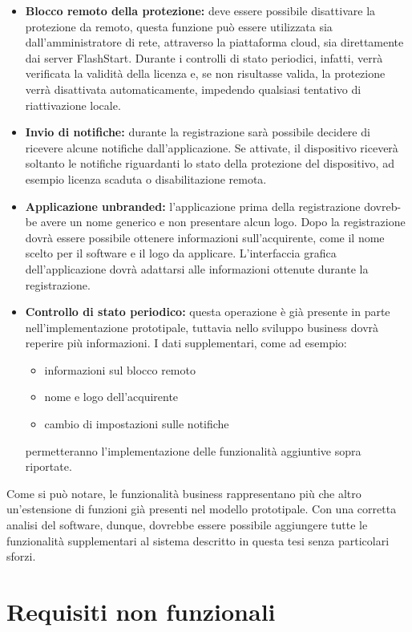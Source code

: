 \documentclass[12pt,a4paper,openright,twoside]{book}
\newcommand{\itemdef}[1]{\item \textbf{#1}}
\begin{document}
\begin{itemize}
	
	\itemdef{Blocco remoto della protezione:}
	deve essere possibile disattivare la protezione da remoto, questa funzione può essere utilizzata sia dall'amministratore di rete, attraverso la piattaforma cloud, sia direttamente dai server FlashStart.
	Durante i controlli di stato periodici, infatti, verrà verificata la validità della licenza e, se non risultasse valida, la protezione verrà disattivata automaticamente, impedendo qualsiasi tentativo di riattivazione locale.
	
	\itemdef{Invio di notifiche:}
	durante la registrazione sarà possibile decidere di ricevere alcune notifiche dall'applicazione.
	Se attivate, il dispositivo riceverà soltanto le notifiche riguardanti lo stato della protezione del dispositivo, ad esempio licenza scaduta o disabilitazione remota.
	
	\itemdef{Applicazione unbranded:} 
	l'applicazione prima della registrazione dovreb-be avere un nome generico e non presentare alcun logo.
	Dopo la registrazione dovrà essere possibile ottenere informazioni sull'acquirente, come il nome scelto per il software e il logo da applicare.
	L'interfaccia grafica dell'applicazione dovrà adattarsi alle informazioni ottenute durante la registrazione.
	
	\itemdef{Controllo di stato periodico:}
	questa operazione è già presente in parte nell'implementazione prototipale, tuttavia nello sviluppo business dovrà reperire più informazioni.
	I dati supplementari, come ad esempio:
	\begin{itemize}
		\item informazioni sul blocco remoto
		\item nome e logo dell'acquirente
		\item cambio di impostazioni sulle notifiche
	\end{itemize}
	permetteranno l'implementazione delle funzionalità aggiuntive sopra riportate.

\end{itemize}
Come si può notare, le funzionalità business rappresentano più che altro un'estensione di funzioni già presenti nel modello prototipale.
Con una corretta analisi del software, dunque, dovrebbe essere possibile aggiungere tutte le funzionalità supplementari al sistema descritto in questa tesi senza particolari sforzi.

\section{Requisiti non funzionali}
\end{document}
